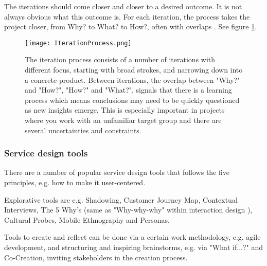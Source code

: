 The iterations should come closer and closer to a desired outcome. It is not always obvious what this outcome is. For each iteration, the process takes the project closer, from Why? to What? to How?, often with overlaps \cite{expedition-mondial}. See figure \ref{fig:iterationprocess}.


\begin{figure}[h]
    \centering
    \texttt{[image: IterationProcess.png]}
    \caption{The iteration process consists of a number of iterations with different focus, starting with broad strokes, and narrowing down into a concrete product. Between iterations, the overlap between "Why?" and "How?", "How?" and "What?", signals that there is a learning process which means conclusions may need to be quickly questioned as new insights emerge. This is especially important in projects where you work with an unfamiliar target group and there are several uncertainties and constraints.}
    \label{fig:iterationprocess}
\end{figure}

\subsubsection{Service design tools}

There are a number of popular service design tools that follows the five principles, e.g. how to make it user-centered.

Explorative tools are e.g. Shadowing, Customer Journey Map, Contextual Interviews, The 5 Why's (same as "Why-why-why" within interaction design \cite{thoughtful}), Cultural Probes, Mobile Ethnography and Personas.

Tools to create and reflect can be done via a certain work methodology, e.g. agile development, and structuring and inspiring brainstorms, e.g. via "What if...?" and Co-Creation, inviting stakeholders in the creation process.

%


%

%
